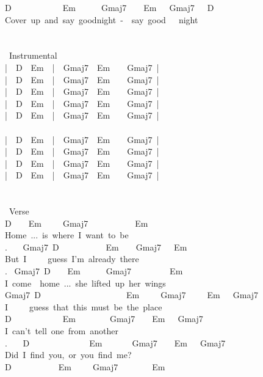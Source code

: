 {D\ \ \ \ \ \ \ \ \ \ \ \ Em\ \ \ \ \ \ Gmaj7\ \ \ \ Em\ \ \ Gmaj7\ \lbrack\ \ D\ \rbrack\\
Cover\ up\ and\ say\ goodnight\ -\ \ say\ good\ \ \ night\\
\\
\\
\lbrack\ Instrumental\rbrack\\
|\ \ D\ \ Em\ \ |\ \ Gmaj7\ \ Em\ \ \ \ Gmaj7\ |\\
|\ \ D\ \ Em\ \ |\ \ Gmaj7\ \ Em\ \ \ \ Gmaj7\ |\\
|\ \ D\ \ Em\ \ |\ \ Gmaj7\ \ Em\ \ \ \ Gmaj7\ |\\
|\ \ D\ \ Em\ \ |\ \ Gmaj7\ \ Em\ \ \ \ Gmaj7\ |\\
|\ \ D\ \ Em\ \ |\ \ Gmaj7\ \ Em\ \ \ \ Gmaj7\ |\\
\\
|\ \ D\ \ Em\ \ |\ \ Gmaj7\ \ Em\ \ \ \ Gmaj7\ |\\
|\ \ D\ \ Em\ \ |\ \ Gmaj7\ \ Em\ \ \ \ Gmaj7\ |\\
|\ \ D\ \ Em\ \ |\ \ Gmaj7\ \ Em\ \ \ \ Gmaj7\ |\\
|\ \ D\ \ Em\ \ |\ \ Gmaj7\ \ Em\ \ \ \ Gmaj7\ |\\
\\
\\
\lbrack\ Verse\rbrack\\
D\ \ \ \ Em\ \ \ \ \ Gmaj7\ \ \ \ \ \ \ \ \ \ \ Em\\
Home\ ...\ is\ where\ I\ want\ to\ be\\
. \ \ \ Gmaj7\ D\ \ \ \ \ \ \ \ \ \ \ Em\ \ \ \ Gmaj7\ \ \ Em\\
But\ I\ \ \ \ \ guess\ I'm\ already\ there\\
. \ Gmaj7\ D\ \ \ \ Em\ \ \ \ \ \ Gmaj7\ \ \ \ \ \ \ \ \ Em\\
I\ come\ \ home\ ...\ she\ lifted\ up\ her\ wings\\
Gmaj7\ D\ \ \ \ \ \ \ \ \ \ \ \ \ \ \ \ \ \ \ \ Em\ \ \ \ \ Gmaj7\ \ \ \ \ Em\ \ \ Gmaj7\\
I\ \ \ \ \ guess\ that\ this\ must\ be\ the\ place\\
D\ \ \ \ \ \ \ \ \ \ \ \ Em\ \ \ \ \ \ \ \ Gmaj7\ \ \ \ Em\ \ \ Gmaj7\\
I\ can't\ tell\ one\ from\ another\\
. \ \ \ D\ \ \ \ \ \ \ \ \ \ \ \ \ \ Em\ \ \ \ \ \ \ Gmaj7\ \ \ \ Em\ \ \ Gmaj7\\
Did\ I\ find\ you,\ or\ you\ find\ me?\\
D\ \ \ \ \ \ \ \ \ \ \ Em\ \ \ \ \ Gmaj7\ \ \ \ \ \ \ \ Em\\
}
